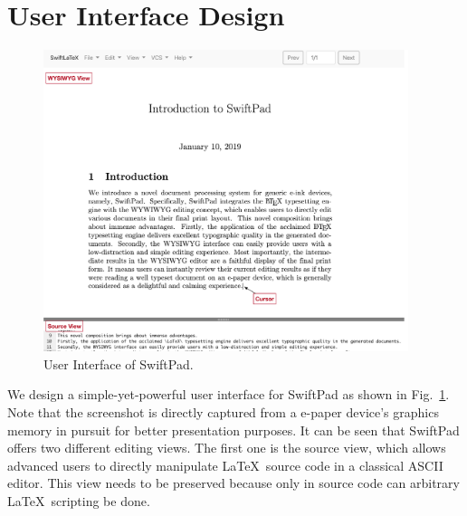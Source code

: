\documentclass[]{sigchi}
\begin{document}


\section{User Interface Design}\label{sect:htmleditor}

\begin{figure}[t]
\begin{center}
\includegraphics[width=0.95\textwidth]{figures/UIscreenshot}
\caption{User Interface of SwiftPad. }
\label{fig:uisc}
\end{center}
\end{figure}
We design a simple-yet-powerful user interface for SwiftPad as shown in Fig.~\ref{fig:uisc}. Note that the screenshot is directly captured from a e-paper device's graphics memory in pursuit for better presentation purposes. It can be seen that SwiftPad offers two different editing views. 
The first one is the source view, which allows advanced users to directly manipulate \LaTeX\ source code in a classical ASCII editor.
This view needs to be preserved because only in source code can arbitrary \LaTeX\ scripting be done. 
\end{document}
